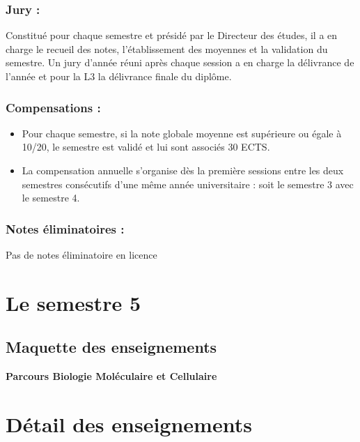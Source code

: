 \documentclass[10pt, a5paper]{report}
\begin{document}
\begin{spacing}{1.5}
\subsubsection*{Jury :} Constitué pour chaque semestre et présidé par le Directeur des études, il a en charge le recueil des notes, l’établissement des moyennes et la validation du semestre. Un jury d’année réuni après chaque session a en charge la délivrance de l’année et pour la L3 la délivrance finale du diplôme.

\subsubsection*{Compensations :}

\begin{itemize}
\item Pour chaque semestre, si la note globale moyenne est supérieure ou égale à 10/20, le semestre est validé et lui sont associés 30 ECTS.
\item La compensation annuelle s'organise dès la première sessions entre les deux semestres consécutifs d'une même année universitaire : soit le semestre 3 avec le semestre 4.
\end{itemize}

\subsubsection*{Notes éliminatoires :}

Pas de notes éliminatoire en licence

\newpage
\section*{Le semestre 5}

\subsection*{Maquette des enseignements}

\textbf{Parcours Biologie Moléculaire et Cellulaire}
\newline



\section*{Détail des enseignements}


\end{spacing}
\end{document}
